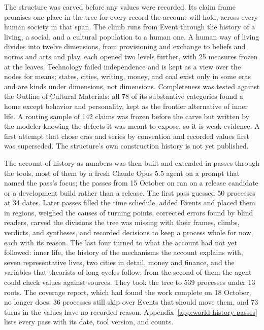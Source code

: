 \documentclass[11pt,a4paper]{article}
\begin{document}
The structure was carved before any values were recorded. Its claim frame
promises one place in the tree for every record the account will hold, across
every human society in that span. The climb runs from Event through the history
of a living, a social, and a cultural population to a human one. A human way of
living divides into twelve dimensions, from provisioning and exchange to beliefs
and norms and arts and play, each opened two levels further, with 25 measures
frozen at the leaves. Technology failed independence and is kept as a view over
the nodes for means; states, cities, writing, money, and coal exist only in some
eras and are kinds under dimensions, not dimensions. Completeness was tested
against the Outline of Cultural Materials: all 78 of its substantive categories
found a home except behavior and personality, kept as the frontier alternative of
inner life. A routing sample of 142 claims was frozen before the carve but
written by the modeler knowing the defects it was meant to expose, so it is weak
evidence. A first attempt that chose eras and series by convention and recorded
values first was superseded. The structure's own construction history is not yet
published.

The account of history as numbers was then built and extended in passes through
the tools, most of them by a fresh Claude Opus 5.5 agent on a prompt that named
the pass's focus; the passes from 15 October on ran on a release candidate or a
development build rather than a release. The first pass guessed 50 processes at
34 dates. Later passes filled the time schedule, added Events and placed them in
regions, weighed the causes of turning points, corrected errors found by blind
readers, carved the divisions the tree was missing with their frames, climbs,
verdicts, and syntheses, and recorded decisions to keep a process whole for now,
each with its reason. The last four turned to what the account had not yet
followed: inner life, the history of the mechanisms the account explains with,
seven representative lives, two cities in detail, money and finance, and the
variables that theorists of long cycles follow; from the second of them the
agent could check values against sources. They took the tree to 539 processes
under 13 roots. The coverage report, which had found the work complete on 18
October, no longer does: 36 processes still skip over Events that should move
them, and 73 turns in the values have no recorded reason.
Appendix~\ref{app:world-history-passes} lists every pass with its date, tool
version, and counts.
\end{document}

